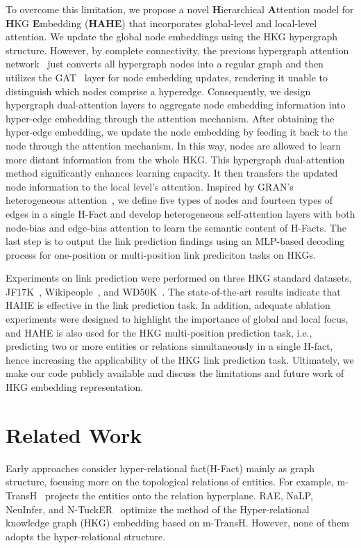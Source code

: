 \documentclass[11pt]{article}
\begin{document}
To overcome this limitation, we propose a novel \textbf{H}ierarchical \textbf{A}ttention model for \textbf{H}KG \textbf{E}mbedding (\textbf{HAHE}) that incorporates global-level and local-level attention. We update the global node embeddings using the HKG hypergraph structure. However, by complete connectivity, the previous hypergraph attention network~\citep{HyperGAT} just converts all hypergraph nodes into a regular graph and then utilizes the GAT~\citep{GAT} layer for node embedding updates, rendering it unable to distinguish which nodes comprise a hyperedge. Consequently, we design hypergraph dual-attention layers to aggregate node embedding information into hyper-edge embedding through the attention mechanism. After obtaining the hyper-edge embedding, we update the node embedding by feeding it back to the node through the attention mechanism. In this way, nodes are allowed to learn more distant information from the whole HKG. This hypergraph dual-attention method significantly enhances learning capacity. It then transfers the updated node information to the local level's attention. Inspired by GRAN's heterogeneous attention~\citep{GRAN}, we define five types of nodes and fourteen types of edges in a single H-Fact and develop heterogeneous self-attention layers with both node-bias and edge-bias attention to learn the semantic content of H-Facts. The last step is to output the link prediction findings using an MLP-based decoding process for one-position or multi-position link prediciton tasks on HKGs.

Experiments on link prediction were performed on three HKG standard datasets, JF17K~\citep{m-TransH}, Wikipeople~\citep{NaLP}, and WD50K~\citep{StarE}. The state-of-the-art results indicate that HAHE is effective in the link prediction task. In addition, adequate ablation experiments were designed to highlight the importance of global and local focus, and HAHE is also used for the HKG multi-position prediction task, i.e., predicting two or more entities or relations simultaneously in a single H-fact, hence increasing the applicability of the HKG link prediction task. Ultimately, we make our code publicly available and discuss the limitations and future work of HKG embedding representation. 



\section{Related Work}

Early approaches consider hyper-relational fact(H-Fact) mainly as graph structure, focusing more on the topological relations of entities. For example, m-TransH~\citep{m-TransH} projects the entities onto the relation hyperplane. RAE, NaLP, NeuInfer, and N-TuckER~\citep{RAE,NaLP,NeuInfer,N-TuckER} optimize the method of the Hyper-relational knowledge graph (HKG) embedding based on m-TransH. However, none of them adopts the hyper-relational structure.
\end{document}
